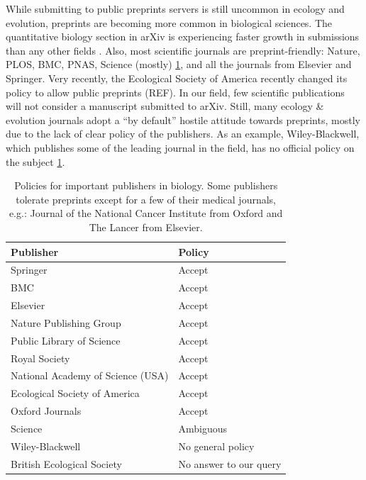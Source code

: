 \documentclass[letterpaper,twocolumn,superscriptaddress,showkeys]{revtex4}
\begin{document}
While submitting to public preprints servers is still uncommon in ecology and
evolution, preprints are becoming more common in biological sciences. The
quantitative biology section in arXiv is experiencing faster growth in
submissions than any other fields \cite{cal12}. Also, most scientific journals
are preprint-friendly: Nature, PLOS, BMC, PNAS, Science (mostly)
\ref{table:policies}, and all the journals from Elsevier and Springer. Very
recently, the Ecological Society of America recently changed its policy to allow
public preprints (REF). In our field, few scientific publications will not
consider a manuscript submitted to arXiv.  Still, many ecology \& evolution
journals adopt a ``by default'' hostile attitude towards preprints, mostly due
to the lack of clear policy of the publishers. As an example, Wiley-Blackwell,
which publishes some of the leading journal in the field, has no official policy
on the subject \ref{table:policies}.

\begin{table}
    \centering
    \begin{tabular}{|ll|}
    \hline
    Publisher                                   & Policy \\
    \hline
    Springer                            	& Accept \\
    BMC                                 	& Accept \\
    Elsevier                            	& Accept \\
    Nature Publishing Group             	& Accept \\
    Public Library of Science           	& Accept \\
    Royal Society                       	& Accept \\
    National Academy of Science (USA)           & Accept \\
    Ecological Society of America       	& Accept \\
    Oxford Journals                             & Accept \\
    Science                             	& Ambiguous \\
    Wiley-Blackwell                       	& No general policy \\
    British Ecological Society                  & No answer to our query \\
    \hline
    \end{tabular}
    \caption{Policies for important publishers in biology. Some publishers
tolerate preprints except for a few of their medical journals, e.g.: Journal
of the National Cancer Institute from Oxford and The Lancer from Elsevier.}
    \label{table:policies}
\end{table}
\end{document}
